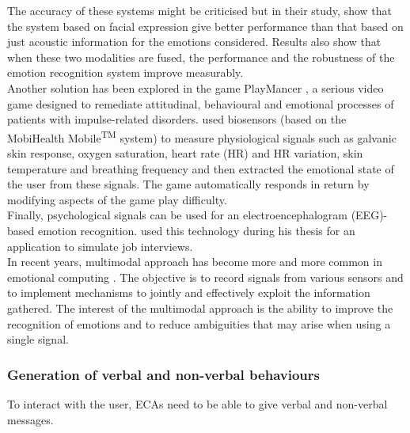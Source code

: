 \documentclass[11pt]{article}
\begin{document}
The accuracy of these systems might be criticised \citep[see][p. 11]{Benyon13} but in their study, \citep{Busso04} show that the system based on facial expression give better performance than that based on just acoustic information for the emotions considered. Results also show that when these two modalities are fused, the performance and the robustness of the emotion recognition system improve measurably.\\

Another solution has been explored in the game PlayMancer \citep{Fernandez12}, a serious video game designed to remediate attitudinal, behavioural and emotional processes of patients with impulse-related disorders. \citeauthor{Fernandez12} used biosensors (based on the MobiHealth Mobile\textsuperscript{TM} system) to measure physiological signals such as galvanic skin response, oxygen saturation, heart rate (HR) and HR variation, skin temperature and breathing frequency and then extracted the emotional state of the user from these signals. The game automatically responds in return by modifying aspects of the game play difficulty. \\

Finally, psychological signals can be used for an electroencephalogram (EEG)-based emotion recognition. \citeauthor{Hamdi12} used this technology during his thesis \citep{Hamdi12} for an application to simulate job interviews. \\

In recent years, multimodal approach has become more and more common in emotional computing \citep{Hamdi12}. The objective is to record signals from various sensors and to implement mechanisms to jointly and effectively exploit the information gathered. The interest of the multimodal approach is the ability to improve the recognition of emotions and to reduce ambiguities that may arise when using a single signal.

\subsubsection{Generation of verbal and non-verbal behaviours}
To interact with the user, ECAs need to be able to give verbal and non-verbal messages. 
\end{document}

